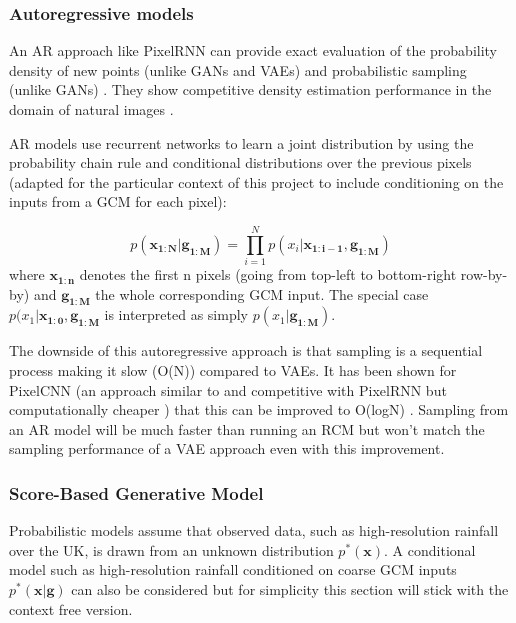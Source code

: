 \subsubsection{Autoregressive models}

An AR approach like PixelRNN \cite{vandenoord2016pixelrnn} can provide exact evaluation of the probability density of new points (unlike GANs and VAEs) and probabilistic sampling (unlike GANs) \cite{grover2018flowgan,kingma2019vaereview,Kobyzev2020nfreview}. They show competitive density estimation performance in the domain of natural images \cite{ho2019flowpp}.

AR models use recurrent networks to learn a joint distribution by using the probability chain rule and conditional distributions over the previous pixels (adapted for the particular context of this project to include conditioning on the inputs from a GCM for each pixel):

\begin{equation}
    p(\mathbf{x_{1:N}}|\mathbf{g_{1:M}}) = \prod_{i=1}^{N} p(x_i|\mathbf{x_{1:i-1}},\mathbf{g_{1:M}})
\end{equation}
where \(\mathbf{x_{1:n}}\) denotes the first n pixels (going from top-left to bottom-right row-by-by) and \(\mathbf{g_{1:M}}\) the whole corresponding GCM input. The special case \(p(x_1|\mathbf{x_{1:0}}, \mathbf{g_{1:M}}\) is interpreted as simply \(p(x_1|\mathbf{g_{1:M}})\).

The downside of this autoregressive approach is that sampling is a sequential process making it slow (O(N)) compared to VAEs. It has been shown for PixelCNN (an approach similar to and competitive with PixelRNN but computationally cheaper \cite{vandenoord2016pixelcnn}) that this can be improved to O(logN) \cite{reed2017pixelcnnfastersampling}. Sampling from an AR model will be much faster than running an RCM but won't match the sampling performance of a VAE approach even with this improvement.

\subsubsection{Score-Based Generative Model}

Probabilistic models assume that observed data, such as high-resolution rainfall over the UK, is drawn from an unknown distribution \(p^*(\mathbf{x})\). A conditional model such as high-resolution rainfall conditioned on coarse GCM inputs \(p^*(\mathbf{x}|\mathbf{g})\) can also be considered but for simplicity this section will stick with the context free version.

